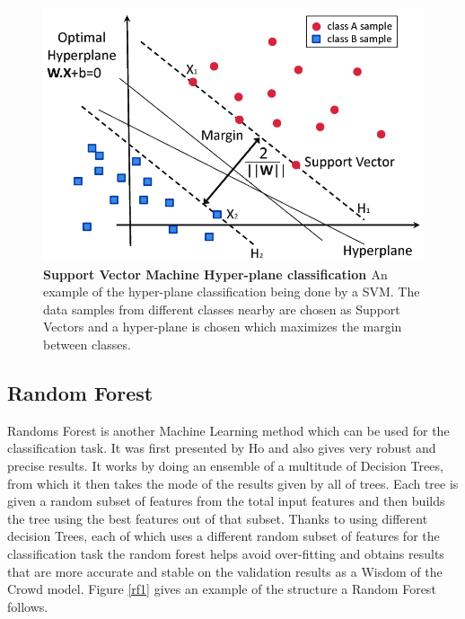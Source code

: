 \begin{figure}[!ht]
	\centerline{\includegraphics[width=5in]{images/background/svm.png}}
	\caption{{\bf Support Vector Machine Hyper-plane classification \cite{svm1}}
		An example of the hyper-plane classification being done by a SVM. The data samples from different classes nearby are chosen as Support Vectors and a hyper-plane is chosen which maximizes the margin between classes.} 
	\label{svm1}
\end{figure}

\subsection{Random Forest}

Randoms Forest is another Machine Learning method which can be used for the classification task. It was first presented by Ho\cite{598994} and also gives very robust and precise results. It works by doing an ensemble of a multitude of Decision Trees, from which it then takes the mode of the results given by all of trees. Each tree is given a random subset of features from the total input features and then builds the tree using the best features out of that subset.  Thanks to using different decision Trees, each of which uses a different random subset of features for the classification task the random forest helps avoid over-fitting and obtains results that are more accurate and stable on the validation results as a Wisdom of the Crowd model. Figure \ref{rf1} gives an example of the structure a Random Forest follows.

